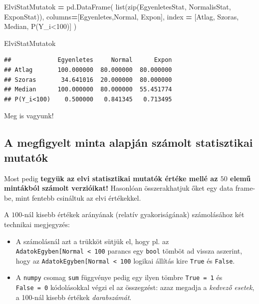 \documentclass[
]{book}
\newenvironment{Shaded}{\begin{snugshade}}{\end{snugshade}}
\newcommand{\BuiltInTok}[1]{#1}
\newcommand{\NormalTok}[1]{#1}
\newcommand{\OperatorTok}[1]{\textcolor[rgb]{0.81,0.36,0.00}{\textbf{#1}}}
\newcommand{\StringTok}[1]{\textcolor[rgb]{0.31,0.60,0.02}{#1}}
\providecommand{\tightlist}{%
  \setlength{\itemsep}{0pt}\setlength{\parskip}{0pt}}
\begin{document}
\begin{Shaded}
\begin{Highlighting}[]
\NormalTok{ElviStatMutatok }\OperatorTok{=}\NormalTok{ pd.DataFrame(}
  \BuiltInTok{list}\NormalTok{(}\BuiltInTok{zip}\NormalTok{(EgyenletesStat, NormalisStat, ExponStat)),}
\NormalTok{  columns}\OperatorTok{=}\NormalTok{[}\StringTok{\textquotesingle{}Egyenletes\textquotesingle{}}\NormalTok{,}\StringTok{\textquotesingle{}Normal\textquotesingle{}}\NormalTok{, }\StringTok{\textquotesingle{}Expon\textquotesingle{}}\NormalTok{],}
\NormalTok{  index }\OperatorTok{=}\NormalTok{ [}\StringTok{\textquotesingle{}Atlag\textquotesingle{}}\NormalTok{, }\StringTok{\textquotesingle{}Szoras\textquotesingle{}}\NormalTok{, }\StringTok{\textquotesingle{}Median\textquotesingle{}}\NormalTok{, }\StringTok{\textquotesingle{}P(Y\_i\textless{}100)\textquotesingle{}}\NormalTok{]}
\NormalTok{)}

\NormalTok{ElviStatMutatok}
\end{Highlighting}
\end{Shaded}

\begin{verbatim}
##             Egyenletes     Normal      Expon
## Atlag       100.000000  80.000000  80.000000
## Szoras       34.641016  20.000000  80.000000
## Median      100.000000  80.000000  55.451774
## P(Y_i<100)    0.500000   0.841345   0.713495
\end{verbatim}

Meg is vagyunk!

\subsection{A megfigyelt minta alapján számolt statisztikai mutatók}\label{a-megfigyelt-minta-alapjuxe1n-szuxe1molt-statisztikai-mutatuxf3k}

Most pedig \textbf{tegyük az elvi statisztikai mutatók értéke mellé az \(50\) elemű mintákból számolt verzióikat!} Hasonlóan összerakhatjuk őket egy data frame-be, mint fentebb csináltuk az elvi értékekkel.

A \(100\)-nál kisebb értékek arányának (relatív gyakoriságának) számolásához két technikai megjegyzés:

\begin{itemize}
\tightlist
\item
  A számolásnál azt a trükköt sütjük el, hogy pl. az \texttt{AdatokEgyben{[}\textquotesingle{}Normal\textquotesingle{}{]}\ \textless{}\ 100} parancs egy \texttt{bool} tömböt ad vissza aszerint, hogy az \texttt{AdatokEgyben{[}\textquotesingle{}Normal\textquotesingle{}{]}\ \textless{}\ 100} logikai állítás kire \texttt{True} és \texttt{False}.
\item
  A \texttt{numpy} csomag \texttt{sum} függvénye pedig egy ilyen tömbre \texttt{True\ =\ 1} és \texttt{False\ =\ 0} kódolásokkal végzi el az összegzést: azaz megadja a \emph{kedvező esetek}, a 100-nál kisebb értékek \emph{darabszámát}.
\end{itemize}
\end{document}
